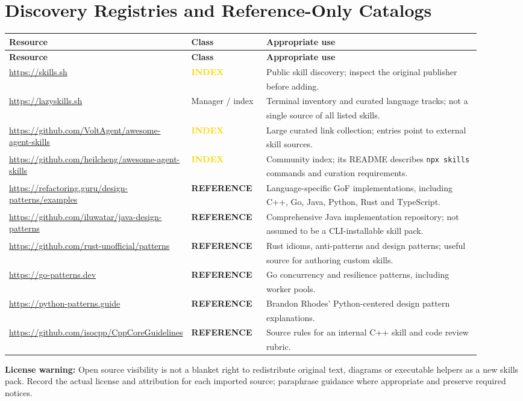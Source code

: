 \documentclass[11pt,letterpaper]{article}
\newcommand{\src}[1]{\textsuperscript{\textcolor{teal}{\cite{#1}}}}
\newcommand{\indexonly}{\textcolor{gold}{\textbf{INDEX}}}
\newcommand{\refonly}{\textcolor{bluegray}{\textbf{REFERENCE}}}
\begin{document}
\section{Discovery Registries and Reference-Only Catalogs}
\begin{longtable}{@{}p{0.27\linewidth}p{0.16\linewidth}p{0.48\linewidth}@{}}
\toprule
\textbf{Resource} & \textbf{Class} & \textbf{Appropriate use}\\\midrule\endfirsthead
\toprule\textbf{Resource}&\textbf{Class}&\textbf{Appropriate use}\\\midrule\endhead
\url{https://skills.sh} & \indexonly & Public skill discovery; inspect the original publisher before adding.\src{vercelcli}\\
\url{https://lazyskills.sh} & Manager / index & Terminal inventory and curated language tracks; not a single source of all listed skills.\src{lazyskills}\\
\url{https://github.com/VoltAgent/awesome-agent-skills} & \indexonly & Large curated link collection; entries point to external skill sources.\src{voltagent}\\
\url{https://github.com/heilcheng/awesome-agent-skills} & \indexonly & Community index; its README describes \texttt{npx skills} commands and curation requirements.\src{heilcheng}\\
\url{https://refactoring.guru/design-patterns/examples} & \refonly & Language-specific GoF implementations, including C++, Go, Java, Python, Rust and TypeScript.\src{refactoring}\\
\url{https://github.com/iluwatar/java-design-patterns} & \refonly & Comprehensive Java implementation repository; not assumed to be a CLI-installable skill pack.\src{iluwatar}\\
\url{https://github.com/rust-unofficial/patterns} & \refonly & Rust idioms, anti-patterns and design patterns; useful source for authoring custom skills.\src{rustpatterns}\\
\url{https://go-patterns.dev} & \refonly & Go concurrency and resilience patterns, including worker pools.\src{gopatterns}\\
\url{https://python-patterns.guide} & \refonly & Brandon Rhodes' Python-centered design pattern explanations.\src{pythonpatterns}\\
\url{https://github.com/isocpp/CppCoreGuidelines} & \refonly & Source rules for an internal C++ skill and code review rubric.\src{cppcore}\\
\bottomrule
\end{longtable}
\textbf{License warning:} Open source visibility is not a blanket right to redistribute original text, diagrams or executable helpers as a new skills pack. Record the actual license and attribution for each imported source; paraphrase guidance where appropriate and preserve required notices.
\end{document}
